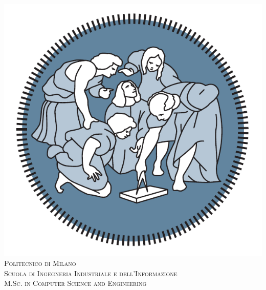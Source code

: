 \documentclass[12pt, a4paper]{article}
\begin{document}
\begin{titlepage}

\newcommand{\HRule}{\rule{\linewidth}{0.5mm}} %

\center %

\includegraphics[width=0.25\paperwidth]{logo}\\[0.5cm] %
 

\textsc{\LARGE Politecnico di Milano}\\[0.4cm] %
\textsc{\Large Scuola di Ingegneria Industriale e dell'Informazione}\\[0.1cm] %
\textsc{\large M.Sc. in Computer Science and Engineering}\\[1.8cm] %


\end{titlepage}
\end{document}
